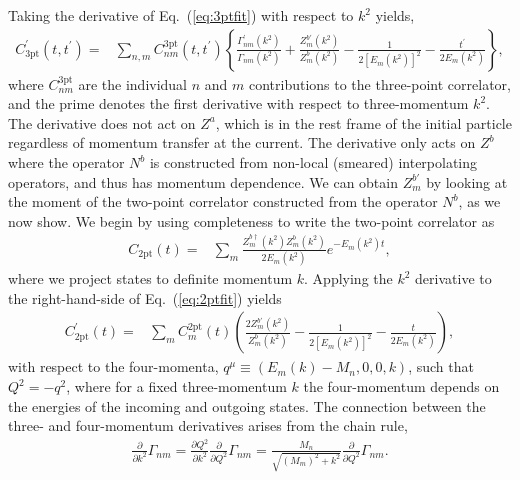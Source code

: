 \documentclass{PoS}
\begin{document}
Taking the derivative of Eq.~(\ref{eq:3ptfit}) with respect to $k^2$ yields,
\begin{align}
C^\prime_{\text{3pt}}(t, t^\prime) = &\sum_{n,m} C^{\text{3pt}}_{nm}(t,t^\prime)\left\{ \frac{\Gamma_{nm}^\prime(k^2)}{\Gamma_{nm}(k^2)} + \frac{Z^{b\prime}_m(k^2)}{Z^b_m(k^2)} - \frac{1}{2[E_m(k^2)]^2} -\frac{t^\prime}{2E_m(k^2)}\right\} \label{3ptmomentfit},
\end{align}
where $C_{nm}^{\text{3pt}}$ are the individual $n$ and $m$ contributions to the three-point correlator, and the prime denotes the first derivative with respect to three-momentum $k^2$. The derivative does not act on $Z^a$, which is in the rest frame of the initial particle regardless of momentum transfer at the current. The derivative only acts on $Z^b$ where the operator $N^b$ is constructed from non-local (smeared) interpolating operators, and thus has momentum dependence. We can obtain $Z_m^{b\prime}$ by looking at the moment of the two-point correlator constructed from the operator $N^b$, as we now show. We begin by using completeness to write the two-point correlator as
\begin{align}
C_{\text{2pt}}(t)= & \sum_m \frac{Z^{b\dagger}_m(k^2)Z^b_m(k^2)}{2E_m(k^2)}e^{-E_m(k^2)t} \label{eq:2ptfit},
\end{align}
where we project states to definite momentum $k$. Applying the $k^2$ derivative to the right-hand-side of Eq.~(\ref{eq:2ptfit}) yields
\begin{align}
C^\prime_{\text{2pt}}(t) 
= & \sum_m C^{\text{2pt}}_m(t) \left(\frac{2Z_m^{b\prime}(k^2)}{Z_m^b(k^2)} - \frac{1}{2[E_m(k^2)]^2}-\frac{t}{2E_m(k^2)}\right),
\end{align}
with respect to the four-momenta, $q^\mu\equiv (E_m(k) - M_n, 0, 0, k)$, such that $Q^2=-q^2$, where for a fixed three-momentum $k$ the four-momentum depends on the energies of the incoming and outgoing states. The connection between the three- and four-momentum derivatives arises from the chain rule,
\begin{align}
\frac{\partial}{\partial k^2} \Gamma_{nm} =  \frac{\partial Q^2}{\partial k^2}\frac{\partial}{\partial Q^2}\Gamma_{nm}
=  \frac{M_n}{\sqrt{(M_m)^2+k^2}}\frac{\partial}{\partial Q^2} \Gamma_{nm}.
\end{align}
\end{document}
